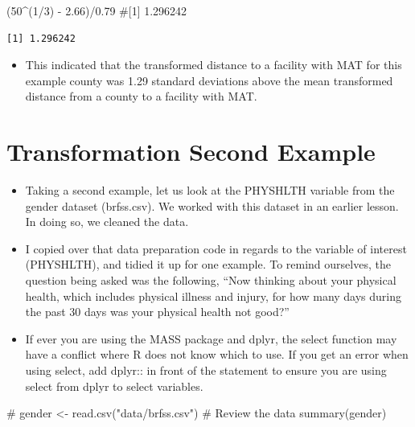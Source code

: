 \documentclass[
  letterpaper,
  DIV=11,
  numbers=noendperiod]{scrreprt}
\newenvironment{Shaded}{\begin{snugshade}}{\end{snugshade}}
\newcommand{\CommentTok}[1]{\textcolor[rgb]{0.37,0.37,0.37}{#1}}
\newcommand{\DecValTok}[1]{\textcolor[rgb]{0.68,0.00,0.00}{#1}}
\newcommand{\FloatTok}[1]{\textcolor[rgb]{0.68,0.00,0.00}{#1}}
\newcommand{\FunctionTok}[1]{\textcolor[rgb]{0.28,0.35,0.67}{#1}}
\newcommand{\NormalTok}[1]{\textcolor[rgb]{0.00,0.23,0.31}{#1}}
\newcommand{\OtherTok}[1]{\textcolor[rgb]{0.00,0.23,0.31}{#1}}
\newcommand{\SpecialCharTok}[1]{\textcolor[rgb]{0.37,0.37,0.37}{#1}}
\newcommand{\StringTok}[1]{\textcolor[rgb]{0.13,0.47,0.30}{#1}}
\providecommand{\tightlist}{%
  \setlength{\itemsep}{0pt}\setlength{\parskip}{0pt}}\usepackage{longtable,booktabs,array}
\begin{document}
\begin{Shaded}
\begin{Highlighting}[]
\NormalTok{(}\DecValTok{50}\SpecialCharTok{\^{}}\NormalTok{(}\DecValTok{1}\SpecialCharTok{/}\DecValTok{3}\NormalTok{) }\SpecialCharTok{{-}} \FloatTok{2.66}\NormalTok{)}\SpecialCharTok{/}\FloatTok{0.79}  \CommentTok{\#[1] 1.296242}
\end{Highlighting}
\end{Shaded}

\begin{verbatim}
[1] 1.296242
\end{verbatim}

\begin{itemize}
\tightlist
\item
  This indicated that the transformed distance to a facility with MAT
  for this example county was 1.29 standard deviations above the mean
  transformed distance from a county to a facility with MAT.
\end{itemize}

\section{Transformation Second
Example}\label{transformation-second-example}

\begin{itemize}
\tightlist
\item
  Taking a second example, let us look at the PHYSHLTH variable from the
  gender dataset (brfss.csv). We worked with this dataset in an earlier
  lesson. In doing so, we cleaned the data.
\item
  I copied over that data preparation code in regards to the variable of
  interest (PHYSHLTH), and tidied it up for one example. To remind
  ourselves, the question being asked was the following, ``Now thinking
  about your physical health, which includes physical illness and
  injury, for how many days during the past 30 days was your physical
  health not good?''
\item
  If ever you are using the MASS package and dplyr, the select function
  may have a conflict where R does not know which to use. If you get an
  error when using select, add dplyr:: in front of the statement to
  ensure you are using select from dplyr to select variables.
\end{itemize}

\begin{Shaded}
\begin{Highlighting}[]
\CommentTok{\#}
\NormalTok{gender }\OtherTok{\textless{}{-}} \FunctionTok{read.csv}\NormalTok{(}\StringTok{"data/brfss.csv"}\NormalTok{)}
\CommentTok{\# Review the data}
\FunctionTok{summary}\NormalTok{(gender)}
\end{Highlighting}
\end{Shaded}
\end{document}
